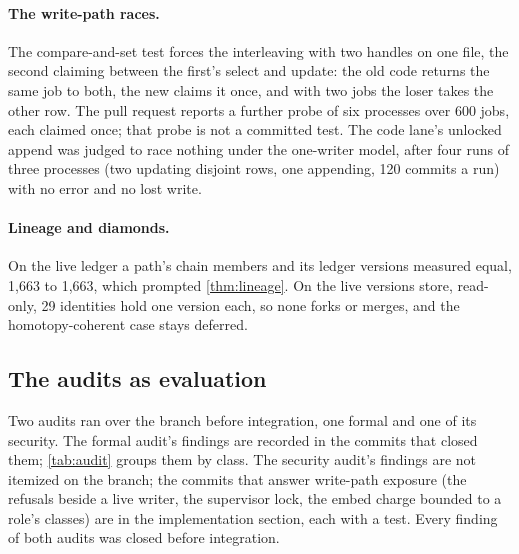 \documentclass[11pt]{article}
\theoremstyle{plain}
\theoremstyle{definition}
\theoremstyle{remark}
\begin{document}
\paragraph{The write-path races.} The compare-and-set test forces the interleaving with two handles
on one file, the second claiming between the first's select and update: the old code returns the
same job to both, the new claims it once, and with two jobs the loser takes the other row. The
pull request reports a further probe of six processes over 600 jobs, each claimed once; that probe
is not a committed test. The code lane's unlocked append was judged to race nothing under the
one-writer model, after four runs of three processes (two updating disjoint rows, one appending,
120 commits a run) with no error and no lost write.

\paragraph{Lineage and diamonds.} On the live ledger a path's chain members and its ledger
versions measured equal, 1,663 to 1,663, which prompted \cref{thm:lineage}. On the live versions
store, read-only, 29 identities hold one version each, so none forks or merges, and the
homotopy-coherent case stays deferred.

\subsection{The audits as evaluation}

Two audits ran over the branch before integration, one formal and one of its security. The formal
audit's findings are recorded in the commits that closed them; \cref{tab:audit} groups them by
class. The security audit's findings are not itemized on the branch; the commits that answer
write-path exposure (the refusals beside a live writer, the supervisor lock, the embed charge
bounded to a role's classes) are in the implementation section, each with a test. Every finding of
both audits was closed before integration.
\end{document}
